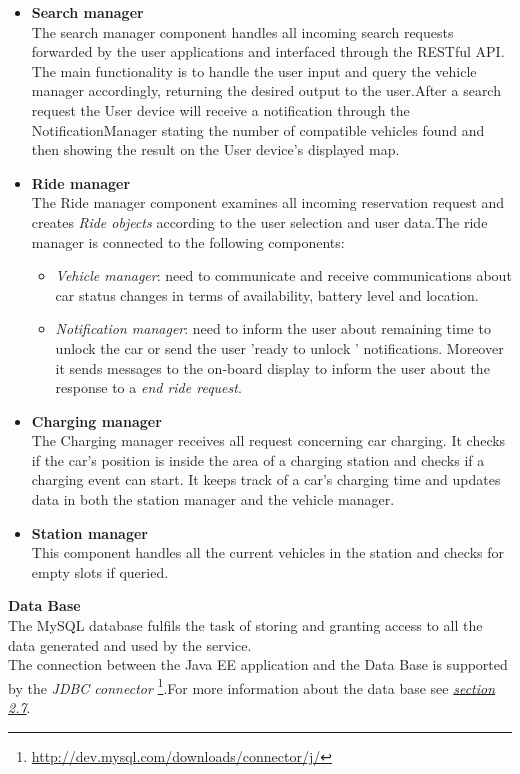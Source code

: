 \begin{itemize}
\item \textbf{Search manager}\\
The search manager component handles all incoming search requests forwarded by the user applications and interfaced through the RESTful API. The main functionality is to handle the user input and query the vehicle manager accordingly, returning the desired output to the user.After a search request the User device will receive a notification through the NotificationManager stating the number of compatible vehicles found and then showing the result on the User device's displayed map.

\item \textbf{Ride manager}\\
The Ride manager component examines all incoming reservation request and creates \textit{Ride objects} according to the user selection and user data.The ride manager is connected to the following components:
\begin{itemize}
\item \textit{Vehicle manager}: need to communicate and receive communications about car status changes in terms of availability, battery level and location.
\item \textit{Notification manager}: need to inform the user about remaining time to unlock the car or send the user 'ready to unlock ' notifications. Moreover it sends messages to the on-board display to inform the user about the response to a \textit{end ride request}.\\[0.4in] 
\end{itemize}
 
\item \textbf{Charging manager}\\
The Charging manager receives all request concerning car charging. It checks if the car's position is inside the area of a charging station and checks if a charging event can start. It keeps track of a car's charging time and updates data in both the station manager and the vehicle manager.

\item \textbf{Station manager}\\
This component handles all the current vehicles in the station and checks for empty slots if queried.

\end{itemize}



\textbf{Data Base}\\[0.1in]
The MySQL database fulfils the task of storing and granting access to all
the data generated and used by the service.\\
The connection between the Java EE application and the Data Base is supported
by the \emph{JDBC connector} \footnote{\url{http://dev.mysql.com/downloads/connector/j/}}.For more information about the data base see \hyperref[sec:DMV]{\emph{section 2.7}}.


